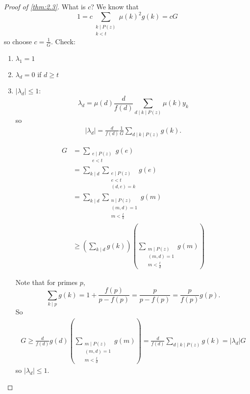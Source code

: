 \documentclass{article}
\newcommand{\1}{\mathbbm{1}}
\begin{document}
\begin{proof}[Proof of \cref{thm:2.3}]
  What is $c$? We know that
  \begin{equation*}
    1 = c \sum_{\substack{k \mid P(z) \\ k < t}} \mu(k)^2 g(k) = cG
  \end{equation*}
  so choose $c = \frac{1}{G}$. Check:
  \begin{enumerate}
    \item $\lambda_1 = 1$ \checkmark
    \item $\lambda_d = 0$ if $d \geq t$ \checkmark
    \item $|\lambda_d| \leq 1$:
      \begin{equation*}
        \lambda_d = \mu(d) \frac{d}{f(d)} \sum_{d \mid k \mid P(z)} \mu(k) y_k
      \end{equation*}
      so
      \begin{align*}
        |\lambda_d| = \frac{d}{f(d)} \frac{1}{G} \sum_{d \mid k \mid P(z)} g(k).
      \end{align*}

      \begin{align*}
        G &= \sum_{\substack{e \mid P(z) \\ e<t}} g(e) \\
          &= \sum_{k \mid d} \sum_{\substack{e \mid P(z) \\ e < t \\ (d,e)=k}} g(e) \\
          &= \sum_{k \mid d} \sum_{\substack{n \mid P(z) \\ (m,d) = 1 \\ m < \frac{t}{k}}} g(m) \\
          &\geq \left(\sum_{k \mid d} g(k)\right) \left(\sum_{\substack{m \mid P(z) \\ (m,d) = 1 \\ m < \frac{t}{d}}} g(m)\right)
      \end{align*}

      Note that for primes $p$,
      \begin{equation*}
        \sum_{k \mid p} g(k) = 1 + \frac{f(p)}{p - f(p)} = \frac{p}{p - f(p)} = \frac{p}{f(p)} g(p).
      \end{equation*}
      So
      \begin{align*}
        G \geq \frac{d}{f(d)} g(d) \left(\sum_{\substack{m \mid P(z) \\ (m,d) = 1 \\ m < \frac{t}{d}}} g(m)\right) = \frac{d}{f(d)} \sum_{d \mid k \mid P(z)} g(k) = |\lambda_d| G
      \end{align*}
      so $|\lambda_d| \leq 1$. \qedhere
  \end{enumerate}
\end{proof}
\end{document}
